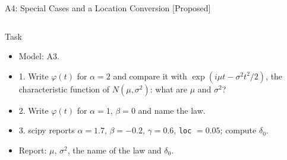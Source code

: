 \begin{frame}{A4: Special Cases and a Location Conversion [Proposed]}
\propsub
\itemsize{\footnotesize}
\begin{columns}[T]
\begin{column}{\taskw}
\begin{block}{Task}
\begin{itemize}
    \item Model: A3.
    \item 1. Write $\varphi(t)$ for $\alpha = 2$ and compare it with $\exp(i\mu t - \sigma^2 t^2/2)$, the characteristic function of $N(\mu, \sigma^2)$: what are $\mu$ and $\sigma^2$?
    \item 2. Write $\varphi(t)$ for $\alpha = 1$, $\beta = 0$ and name the law.
    \item 3. scipy reports $\alpha = 1.7$, $\beta = -0.2$, $\gamma = 0.6$, \texttt{loc} $= 0.05$; compute $\delta_0$.
    \item Report: $\mu$, $\sigma^2$, the name of the law and $\delta_0$.
\end{itemize}
\end{block}
\end{column}
\begin{column}{\solw}
\end{column}
\end{columns}
\end{frame}


